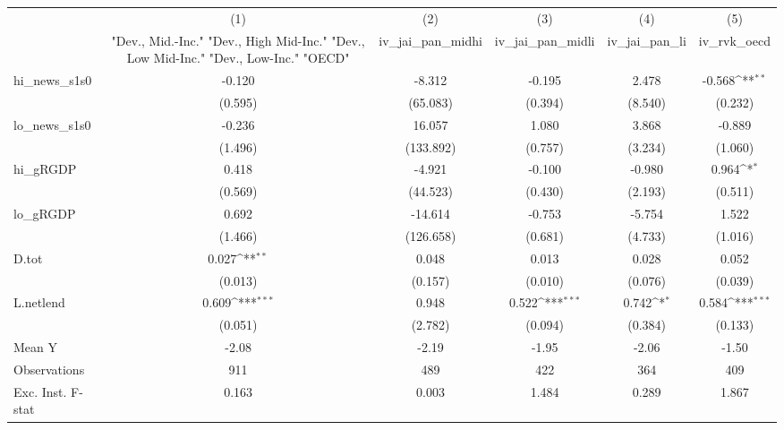 {
\def\sym#1{\ifmmode^{#1}\else\(^{#1}\)\fi}
\begin{tabular}{l*{5}{c}}
\toprule
            &\multicolumn{1}{c}{(1)}&\multicolumn{1}{c}{(2)}&\multicolumn{1}{c}{(3)}&\multicolumn{1}{c}{(4)}&\multicolumn{1}{c}{(5)}\\
            &\multicolumn{1}{c}{ "Dev., Mid.-Inc." "Dev., High Mid-Inc." "Dev., Low Mid-Inc." "Dev., Low-Inc." "OECD" }&\multicolumn{1}{c}{iv\_jai\_pan\_midhi}&\multicolumn{1}{c}{iv\_jai\_pan\_midli}&\multicolumn{1}{c}{iv\_jai\_pan\_li}&\multicolumn{1}{c}{iv\_rvk\_oecd}\\
\midrule
hi\_news\_s1s0&      -0.120         &      -8.312         &      -0.195         &       2.478         &      -0.568\sym{**} \\
            &     (0.595)         &    (65.083)         &     (0.394)         &     (8.540)         &     (0.232)         \\
\addlinespace
lo\_news\_s1s0&      -0.236         &      16.057         &       1.080         &       3.868         &      -0.889         \\
            &     (1.496)         &   (133.892)         &     (0.757)         &     (3.234)         &     (1.060)         \\
\addlinespace
hi\_gRGDP    &       0.418         &      -4.921         &      -0.100         &      -0.980         &       0.964\sym{*}  \\
            &     (0.569)         &    (44.523)         &     (0.430)         &     (2.193)         &     (0.511)         \\
\addlinespace
lo\_gRGDP    &       0.692         &     -14.614         &      -0.753         &      -5.754         &       1.522         \\
            &     (1.466)         &   (126.658)         &     (0.681)         &     (4.733)         &     (1.016)         \\
\addlinespace
D.tot       &       0.027\sym{**} &       0.048         &       0.013         &       0.028         &       0.052         \\
            &     (0.013)         &     (0.157)         &     (0.010)         &     (0.076)         &     (0.039)         \\
\addlinespace
L.netlend   &       0.609\sym{***}&       0.948         &       0.522\sym{***}&       0.742\sym{*}  &       0.584\sym{***}\\
            &     (0.051)         &     (2.782)         &     (0.094)         &     (0.384)         &     (0.133)         \\
\midrule
Mean Y      &       -2.08         &       -2.19         &       -1.95         &       -2.06         &       -1.50         \\
Observations&         911         &         489         &         422         &         364         &         409         \\
Exc. Inst. F-stat&       0.163         &       0.003         &       1.484         &       0.289         &       1.867         \\
\bottomrule
\end{tabular}
}
